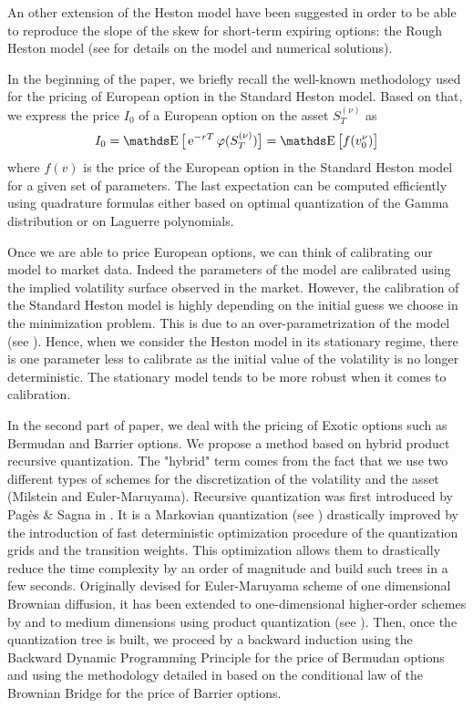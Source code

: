 An other extension of the Heston model have been suggested in order to be able to reproduce the slope of the skew for short-term expiring options: the Rough Heston model (see \cite{jaisson2016rough,guennoun2018asymptotic,gatheral2018volatility,giorgia2018fast,gatheral2019rational} for details on the model and numerical solutions).

\medskip
In the beginning of the paper, we briefly recall the well-known methodology used for the pricing of European option in the Standard Heston model. Based on that, we express the price $I_0$ of a European option on the asset $S_T^{(\nu)}$ as
\begin{equation}
	I_0 = \E \big[ \e^{-r T} \varphi ( S_T^{(\nu)} ) \big] = \E \big[ f (v_0^{\nu}) \big]
\end{equation}
where $f(v)$ is the price of the European option in the Standard Heston model for a given set of parameters. The last expectation can be computed efficiently using quadrature formulas either based on optimal quantization of the Gamma distribution or on Laguerre polynomials.

Once we are able to price European options, we can think of calibrating our model to market data. Indeed the parameters of the model are calibrated using the implied volatility surface observed in the market. However, the calibration of the Standard Heston model is highly depending on the initial guess we choose in the minimization problem. This is due to an over-parametrization of the model (see \cite{gauthier2009fitting}). Hence, when we consider the Heston model in its stationary regime, there is one parameter less to calibrate as the initial value of the volatility is no longer deterministic. The stationary model tends to be more robust when it comes to calibration.

\medskip

In the second part of paper, we deal with the pricing of Exotic options such as Bermudan and Barrier options. We propose a method based on hybrid product recursive quantization. The "hybrid" term comes from the fact that we use two different types of schemes for the discretization of the volatility and the asset (Milstein and Euler-Maruyama). Recursive quantization was first introduced by Pagès $\&$ Sagna in \cite{pages2015recursive}. It is a Markovian quantization (see \cite{pages2004optimal}) drastically improved by the introduction of fast deterministic optimization procedure of the quantization grids and the transition weights. This optimization allows them to drastically reduce the time complexity by an order of magnitude and build such trees in a few seconds. Originally devised for Euler-Maruyama scheme of one dimensional Brownian diffusion, it has been extended to one-dimensional higher-order schemes by \cite{mcwalter2018recursive} and to medium dimensions using product quantization (see \cite{abbas2018product,rudd2017fast,callegaro2017american,callegaro2017pricing,sagna2018general}). Then, once the quantization tree is built, we proceed by a backward induction using the Backward Dynamic Programming Principle for the price of Bermudan options and using the methodology detailed in \cite{sagna2010pricing,pages2018numerical} based on the conditional law of the Brownian Bridge for the price of Barrier options.


